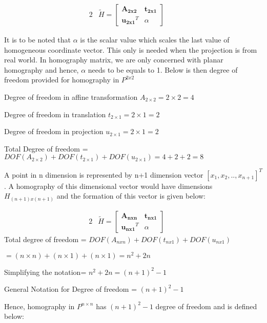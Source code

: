 \documentclass{article}
\begin{document}
\begin{alignat}{2}
&\tilde{H} = \begin{bmatrix}
\mathbf{A_{2x2}} & \mathbf{t_{2x1}} \\
\mathbf{u_{2x1}}^{T} & \alpha
\end{bmatrix} & \quad   \label{eq:e1}
\end{alignat}

It is to be noted that \(\alpha\) is the scalar value which scales the last value of homogeneous coordinate vector. This only is needed when the projection is from real world. In homography matrix, we are only concerned with planar homography and hence, \(\alpha\) needs to be equals to 1. Below is then degree of freedom provided for homography in $P^{2x2}$ \newline

Degree of freedom in affine transformation $A_{2\times2}= 2\times2=4$

Degree of freedom in translation $t_{2\times1}= 2\times1= 2$

Degree of freedom in projection $u_{2\times1}= 2\times1=2$

Total Degree of freedom = $DOF(A_{2\times2})+ DOF(t_{2\times1})+ DOF(u_{2\times1})= 4+2+2= 8$ \newline

A point in n dimension is represented by n+1 dimension vector $[x_{1},x_{2},.., x_{n+1}]^{T}$. A homography of this dimensional vector would have dimensions $H_{(n+1)x(n+1)}$ and the formation of this vector is given below:

\begin{alignat}{2}
&\tilde{H} = \begin{bmatrix}
\mathbf{A_{nxn}} & \mathbf{t_{nx1}} \\
\mathbf{u_{nx1}}^{T} & \alpha
\end{bmatrix} & \quad   \label{eq:e1}
\end{alignat}
\newline
Total degree of freedom = $DOF(A_{nxn})+DOF(t_{nx1})+DOF(u_{nx1})$

$= (n \times n) + (n \times 1) + (n \times 1)= n^{2}+2n$

Simplifying the notation= $n^{2}+2n= (n+1)^{2}-1$


General Notation for Degree of freedom = $(n+1)^{2}-1$ \newline

Hence, homography in $P^{n \times n}$ has $(n+1)^{2} -1$ degree of freedom and is defined below:
\end{document}
